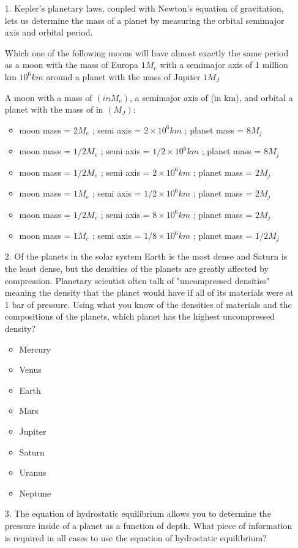 \begin{enumerate}
    \item[1.] Kepler's planetary laws, coupled with Newton's equation of 
    gravitation, lets us determine the mass of a planet by measuring the 
    orbital semimajor axis and orbital period. 
    
    Which one of the 
    following moons will have almost exactly the same period as a moon with the mass of Europa $1 M_e$ with a semimajor axis of 1 million km  $10^6 km$ around a planet with the mass of Jupiter $1 M_J$
    
    A moon with a mass of $(in M_e)$, a semimajor axis of (in km), and orbital a planet with the mass of in $(M_J)$:
    \begin{itemize}[label={$\bullet$}]
        \item moon mass = $2 M_e$ ; semi axis = $2 \times 10^6 km$ ; planet mass = $8 M_j$
        \item moon mass = $1/2 M_e$ ; semi axis = $1/2 \times 10^6 km$ ; planet mass = $8 M_j$
        \item moon mass = $1/2 M_e$ ; semi axis = $2 \times 10^6 km$ ; planet mass = $2 M_j$
        \item moon mass = $1 M_e$ ; semi axis = $1/2 \times 10^6 km$ ; planet mass = $2 M_j$
        \item moon mass = $1/2 M_e$ ; semi axis = $8 \times 10^6 km$ ; planet mass = $2 M_j$
        \item moon mass = $1 M_e$ ; semi axis = $1/8 \times 10^6 km$ ; planet mass = $1/2 M_j$
    \end{itemize}

    \item[2.] Of the planets in the solar system Earth is the most dense and Saturn is the least dense, but the densities of the planets are greatly affected  by compression. Planetary scientist often talk of "uncompressed densities" meaning the density that the planet would have if all of its materials were at 1 bar of pressure. Using what you know of the densities of materials and the compositions of the planets, which planet has the highest uncompressed density?
    \begin{multicols}{4}
    \begin{itemize}[label={$\bullet$}]
       \item Mercury
       \item Venus
       \item Earth
       \item Mars
       \item Jupiter
       \item Saturn
       \item Uranus
       \item Neptune
    \end{itemize}
\end{multicols}
    \item[3.]     The equation of hydrostatic equilibrium allows you to determine the pressure inside of a planet as a function of depth. 
    What piece of information is required in all cases to use the equation of hydrostatic equilibrium?
    

\end{enumerate}
